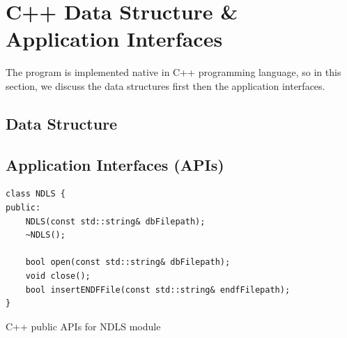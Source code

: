 
\clearpage
\section{C++ Data Structure \& Application Interfaces}
The program is implemented native in C++ programming language, so in this section, we discuss the data structures first then the application interfaces.

\subsection{Data Structure}


\subsection{Application Interfaces (APIs)}
\begin{program}[!htb]
\centering
\begin{verbatim} 
class NDLS {
public:
    NDLS(const std::string& dbFilepath);
    ~NDLS();
    
    bool open(const std::string& dbFilepath);
    void close();
    bool insertENDFFile(const std::string& endfFilepath);
}
\end{verbatim}
\caption{ \label{program:ndls_cpp_api}
C++ public APIs for NDLS module}
\end{program}
